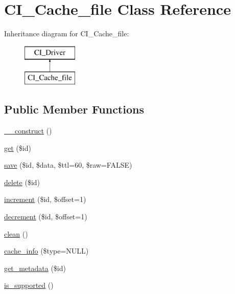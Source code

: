 \hypertarget{class_c_i___cache__file}{}\section{C\+I\+\_\+\+Cache\+\_\+file Class Reference}
\label{class_c_i___cache__file}
Inheritance diagram for C\+I\+\_\+\+Cache\+\_\+file\+:\begin{figure}[H]
\begin{center}
\leavevmode
\includegraphics[height=2.000000cm]{class_c_i___cache__file}
\end{center}
\end{figure}
\subsection*{Public Member Functions}
\begin{DoxyCompactItemize}
\item 
\mbox{\hyperlink{class_c_i___cache__file_aa972f330341b04483829e8aa464d689d}{\+\_\+\+\_\+construct}} ()
\item 
\mbox{\hyperlink{class_c_i___cache__file_ad3be8908694264efcf394acf1025d27b}{get}} (\$id)
\item 
\mbox{\hyperlink{class_c_i___cache__file_afad6e4827168c54e421213a291d58295}{save}} (\$id, \$data, \$ttl=60, \$raw=F\+A\+L\+SE)
\item 
\mbox{\hyperlink{class_c_i___cache__file_a3baff13908c069f839c4363713bc3374}{delete}} (\$id)
\item 
\mbox{\hyperlink{class_c_i___cache__file_ad2597511eda7d8300ec78b6346810d7e}{increment}} (\$id, \$offset=1)
\item 
\mbox{\hyperlink{class_c_i___cache__file_ae31a385d3dee300f3362dc20dd1951bc}{decrement}} (\$id, \$offset=1)
\item 
\mbox{\hyperlink{class_c_i___cache__file_a7af3371589ac5bdb2aed9e474257e439}{clean}} ()
\item 
\mbox{\hyperlink{class_c_i___cache__file_a8ef586f2e10ac9bbdd0eaf09796592d3}{cache\+\_\+info}} (\$type=N\+U\+LL)
\item 
\mbox{\hyperlink{class_c_i___cache__file_a3c2223ea43cd7fa6dc45f7d31120a7b3}{get\+\_\+metadata}} (\$id)
\item 
\mbox{\hyperlink{class_c_i___cache__file_afb3e70182a521fcae83192adbda57c6f}{is\+\_\+supported}} ()
\end{DoxyCompactItemize}
